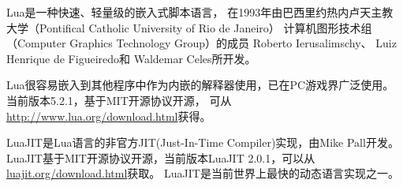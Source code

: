 Lua是一种快速、轻量级的嵌入式脚本语言，
在1993年由巴西里约热内卢天主教大学（Pontifical Catholic University of Rio de Janeiro）
计算机图形技术组（Computer Graphics Technology Group）的成员
Roberto Ierusalimschy、 Luiz Henrique de Figueiredo和 Waldemar Celes所开发。
\cite{LuaWiki}

Lua很容易嵌入到其他程序中作为内嵌的解释器使用，已在PC游戏界广泛使用。
当前版本5.2.1，基于MIT开源协议开源，
可从 \url{http://www.lua.org/download.html}获得。

LuaJIT是Lua语言的非官方JIT(Just-In-Time Compiler)实现，由Mike Pall开发。
LuaJIT基于MIT开源协议开源，当前版本LuaJIT 2.0.1，可以从\url{luajit.org/download.html}获取。
LuaJIT是当前世界上最快的动态语言实现之一。\cite{LuaJITHomepage}

